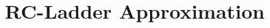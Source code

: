 \documentclass[conference]{IEEEtran}
\begin{document}



%
%
%
%

\section{RC-Ladder Approximation}
\label{sec:methodology}
\end{document}

